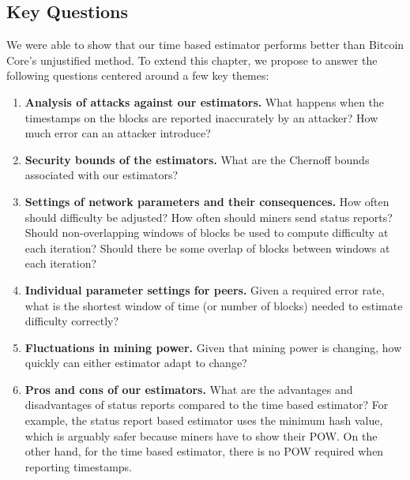 \subsection{Key Questions}
We were able to show that our time based estimator performs better than Bitcoin Core's unjustified method. To extend this chapter, we propose to answer the following questions centered around a few key themes:
\begin{enumerate}
\item \textbf{Analysis of attacks against our estimators.} What happens when the timestamps on the blocks are reported inaccurately by an attacker? How much error can an attacker introduce?
\item \textbf{Security bounds of the estimators.} What are the Chernoff bounds associated with our estimators?
\item \textbf{Settings of network parameters and their consequences.} How often should difficulty be adjusted? How often should miners send status reports? Should non-overlapping windows of blocks be used to compute difficulty at each iteration? Should there be some overlap of blocks between windows at each iteration?
\item \textbf{Individual parameter settings for peers.} Given a required error rate, what is the shortest window of time (or number of blocks) needed to estimate difficulty correctly?
\item \textbf{Fluctuations in mining power.} Given that mining power is changing, how quickly can either estimator adapt to change?
\item \textbf{Pros and cons of our estimators.} What are the advantages and disadvantages of status reports compared to the time based estimator? For example, the status report based estimator uses the minimum hash value, which is arguably safer because miners have to show their POW. On the other hand, for the time based estimator, there is no POW required when reporting timestamps.
\end{enumerate}


%
